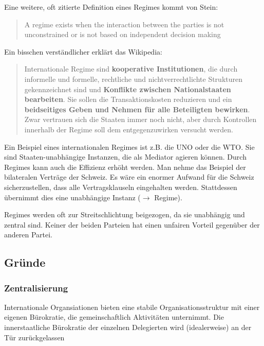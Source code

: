 \documentclass[a4paper, 11pt]{article}
\begin{document}
\noindent Eine weitere, oft zitierte Definition eines Regimes kommt von Stein:
\begin{quote}
	\begin{blockquote}[Stein 1982]{A regime exists when the interaction between the parties is not unconstrained or is not based on independent decision making}
	\end{blockquote}
\end{quote}

\noindent Ein bisschen verständlicher erklärt das Wikipedia: 
\begin{quote}
	\begin{blockquote}[Wikipedia]{Internationale Regime sind \textbf{kooperative Institutionen}, die durch informelle und formelle, rechtliche und nichtverrechtlichte Strukturen gekennzeichnet sind und \textbf{Konflikte zwischen Nationalstaaten bearbeiten}. Sie sollen die Transaktionskosten reduzieren und ein \textbf{beidseitiges Geben und Nehmen für alle Beteiligten bewirken}. Zwar vertrauen sich die Staaten immer noch nicht, aber durch Kontrollen innerhalb der Regime soll dem entgegenzuwirken versucht werden.}
	\end{blockquote}
\end{quote}
Ein Beispiel eines internationalen Regimes ist z.B. die UNO oder die WTO. Sie sind Staaten-unabhängige Instanzen, die als Mediator agieren können. Durch Regimes kann auch die Effizienz erhöht werden. Man nehme das Beispiel der bilateralen Verträge der Schweiz. Es wäre ein enormer Aufwand für die Schweiz sicherzustellen, dass alle Vertragsklauseln eingehalten werden. Stattdessen übernimmt dies eine unabhängige Instanz ($\rightarrow$ Regime).  


\vspace{10px}

Regimes werden oft zur Streitschlichtung beigezogen, da sie unabhängig und zentral sind. Keiner der beiden Parteien hat einen unfairen Vorteil gegenüber der anderen Partei.

\subsection{Gründe}

\subsubsection*{Zentralisierung}

Internationale Organsiationen bieten eine stabile Organisationsstruktur mit einer eigenen Bürokratie, die gemeinschaftlich Aktivitäten unternimmt. Die innerstaatliche Bürokratie der einzelnen Delegierten wird (idealerweise) an der Tür zurückgelassen
\end{document}
